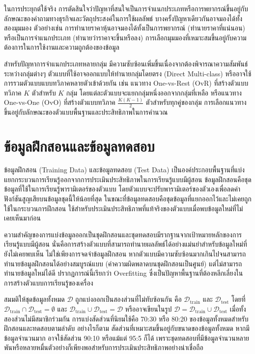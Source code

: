 ในการประยุกต์ใช้จริง การตัดสินใจว่าปัญหาที่สนใจเป็นการจำแนกประเภทหรือการพยากรณ์ขึ้นอยู่กับลักษณะของคำถามทางธุรกิจและวัตถุประสงค์ในการใช้ผลลัพธ์ บางครั้งปัญหาเดียวกันอาจมองได้ทั้งสองมุมมอง ตัวอย่างเช่น การทำนายราคาหุ้นอาจมองได้ทั้งเป็นการพยากรณ์ (ทำนายราคาที่แน่นอน) หรือเป็นการจำแนกประเภท (ทำนายว่าราคาจะขึ้นหรือลง) การเลือกมุมมองที่เหมาะสมขึ้นอยู่กับความต้องการในการใช้งานและความถูกต้องของข้อมูล

สำหรับปัญหาการจำแนกประเภทหลายกลุ่ม มีความซับซ้อนเพิ่มขึ้นเนื่องจากต้องพิจารณาความสัมพันธ์ระหว่างกลุ่มต่างๆ ตัวแบบที่ใช้อาจออกแบบให้ทำนายกลุ่มโดยตรง (Direct Multi-class) หรืออาจใช้การรวมตัวแบบแบบทวิภาคหลายตัวเข้าด้วยกัน เช่น แนวทาง One-vs-Rest (OvR) ที่สร้างตัวแบบทวิภาค $K$ ตัวสำหรับ $K$ กลุ่ม โดยแต่ละตัวแบบจะแยกกลุ่มหนึ่งออกจากกลุ่มที่เหลือ หรือแนวทาง One-vs-One (OvO) ที่สร้างตัวแบบทวิภาค $\frac{K(K-1)}{2}$ ตัวสำหรับทุกคู่ของกลุ่ม การเลือกแนวทางขึ้นอยู่กับลักษณะของตัวแบบพื้นฐานและประสิทธิภาพในการคำนวณ

\section{ข้อมูลฝึกสอนและข้อมูลทดสอบ}
ข้อมูลฝึกสอน (Training Data) และข้อมูลทดสอบ (Test Data) เป็นองค์ประกอบพื้นฐานที่แบ่งแยกกระบวนการเรียนรู้ออกจากการประเมินประสิทธิภาพในการเรียนรู้แบบมีผู้สอน ข้อมูลฝึกสอนคือชุดข้อมูลที่ใช้ในการเรียนรู้พารามิเตอร์ของตัวแบบ โดยตัวแบบจะปรับพารามิเตอร์ของตัวเองเพื่อลดค่าฟังก์ชันสูญเสียบนข้อมูลชุดนี้ให้น้อยที่สุด ในขณะที่ข้อมูลทดสอบคือชุดข้อมูลที่แยกออกไว้และไม่เคยถูกใช้ในกระบวนการฝึกสอน ใช้สำหรับประเมินประสิทธิภาพที่แท้จริงของตัวแบบเมื่อพบข้อมูลใหม่ที่ไม่เคยเห็นมาก่อน

ความสำคัญของการแบ่งข้อมูลออกเป็นชุดฝึกสอนและชุดทดสอบมีรากฐานจากเป้าหมายหลักของการเรียนรู้แบบมีผู้สอน นั่นคือการสร้างตัวแบบที่สามารถทำนายผลลัพธ์ได้อย่างแม่นยำสำหรับข้อมูลใหม่ที่ยังไม่เคยพบเห็น ไม่ใช่เพียงการจดจำข้อมูลฝึกสอน หากตัวแบบมีความซับซ้อนมากเกินไปจนสามารถทำนายข้อมูลฝึกสอนได้อย่างสมบูรณ์แบบ (ค่าความผิดพลาดบนชุดฝึกสอนเป็นศูนย์) แต่ไม่สามารถทำนายข้อมูลใหม่ได้ดี ปรากฏการณ์นี้เรียกว่า Overfitting ซึ่งเป็นปัญหาพื้นฐานที่ต้องหลีกเลี่ยงในการสร้างตัวแบบการเรียนรู้ของเครื่อง

สมมติให้ชุดข้อมูลทั้งหมด $\mathcal{D}$ ถูกแบ่งออกเป็นสองส่วนที่ไม่ทับซ้อนกัน คือ $\mathcal{D}_{\text{train}}$ และ $\mathcal{D}_{\text{test}}$ โดยที่ $\mathcal{D}_{\text{train}} \cap \mathcal{D}_{\text{test}} = \emptyset$ และ $\mathcal{D}_{\text{train}} \cup \mathcal{D}_{\text{test}} = \mathcal{D}$ หรืออาจเขียนในรูป $\mathcal{D} = \mathcal{D}_{\text{train}} \cup \mathcal{D}_{\text{test}}$ เมื่อทั้งสองส่วนไม่มีสมาชิกร่วมกัน การแบ่งสัดส่วนที่นิยมใช้คือ 70:30 หรือ 80:20 ของข้อมูลทั้งหมดสำหรับฝึกสอนและทดสอบตามลำดับ อย่างไรก็ตาม สัดส่วนที่เหมาะสมขึ้นอยู่กับขนาดของข้อมูลทั้งหมด หากมีข้อมูลจำนวนมาก อาจใช้สัดส่วน 90:10 หรือแม้แต่ 95:5 ก็ได้ เพราะชุดทดสอบที่มีข้อมูลจำนวนหลายพันหรือหลายหมื่นตัวอย่างก็เพียงพอสำหรับการประเมินประสิทธิภาพอย่างน่าเชื่อถือ

